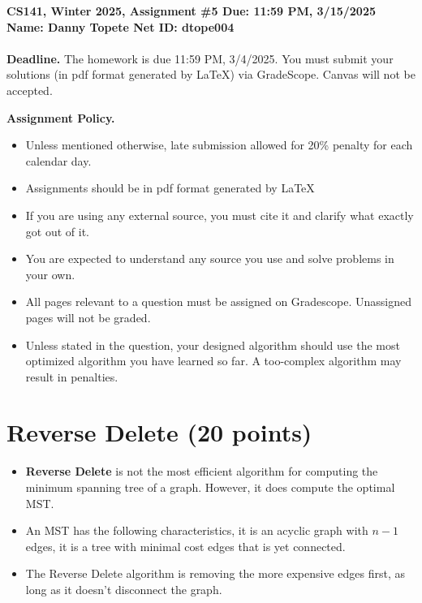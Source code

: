 \documentclass{article}[12pt]
\newcommand{\policy}[1]{#1}
\newcommand{\policy}[1]{}
\newcommand{\deadline}{11:59 PM, 3/15/2025}
\newcommand{\assigntitle}[1]{{
  \noindent \large \bf
  CS141, Winter 2025,
  Assignment \##1 \hfill Due: {\deadline}\\
  Name: Danny Topete %
  \hspace{2.5in}
  Net ID: dtope004 %
  \\
  [-.05in]
  \mbox{}\hrulefill \mbox{}\\}}
\begin{document}
\assigntitle{5}{}
\policy{\textbf{Deadline.} The homework is due 11:59 PM, 3/4/2025. You must submit your solutions (in pdf
format generated by LaTeX) via GradeScope. Canvas will not be accepted.}\\
\date{}
\policy{\textbf{Assignment Policy.}
\begin{itemize}
    \item Unless mentioned otherwise, late submission allowed for 20\% penalty for each calendar day.
    \item Assignments should be in pdf format generated by LaTeX
    \item If you are using any external source, you must cite it and clarify what exactly got out of it.
    \item You are expected to understand any source you use and solve problems in your own.
    \item All pages relevant to a question must be assigned on Gradescope. Unassigned pages will not be graded.
    \item Unless stated in the question, your designed algorithm should use the most optimized algorithm you have learned so far. A too-complex algorithm may result in penalties.
\end{itemize}


}


\section{Reverse Delete (20 points)}
\begin{itemize}
  \item \textbf{Reverse Delete} is not the most efficient algorithm for computing the minimum spanning tree of a graph. 
    However, it does compute the optimal MST.
  \item An MST has the following characteristics, it is an acyclic graph with $n-1$ edges,
    it is a tree with minimal cost edges that is yet connected.
  \item The Reverse Delete algorithm is removing the more expensive edges first, as long as it doesn't disconnect the graph.
\end{itemize}

\newpage
\end{document}
